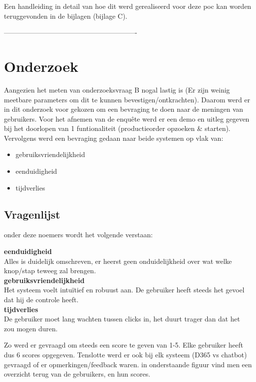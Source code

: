 Een handleiding in detail van hoe dit werd gerealiseerd voor deze poc kan worden teruggevonden in de bijlagen (bijlage C).

----------------------------------------------------------
\section{Onderzoek}
Aangezien het meten van onderzoeksvraag B nogal lastig is (Er zijn weinig meetbare parameters om dit te kunnen bevestigen/ontkrachten). Daarom werd er in dit onderzoek voor gekozen om een bevraging te doen naar de meningen van gebruikers. Voor het afnemen van de enquête werd er een demo en uitleg gegeven bij het doorlopen van 1 funtionaliteit (productieorder opzoeken \& starten). Vervolgens werd een bevraging gedaan naar beide systemen op vlak van: 

\begin{itemize}
    \item gebruiksvriendelijkheid
    \item eenduidigheid
    \item tijdverlies
\end{itemize}

\subsection{Vragenlijst}
onder deze noemers wordt het volgende verstaan:

\textbf{eenduidigheid}\\
Alles is duidelijk omschreven, er heerst geen onduidelijkheid over wat welke knop/stap teweeg zal brengen.\\

\textbf{gebruiksvriendelijkheid}\\
Het systeem voelt intuïtief en robuust aan. De gebruiker heeft steeds het gevoel dat hij de controle heeft.\\

\textbf{tijdverlies}\\
De gebruiker moet lang wachten tussen clicks in, het duurt trager dan dat het zou mogen duren.

Zo werd er gevraagd om steeds een score te geven van 1-5. Elke gebruiker heeft dus 6 scores opgegeven. Tenslotte werd er ook bij elk systeem (D365 vs chatbot) gevraagd of er opmerkingen/feedback waren.
in onderstaande figuur vind men een overzicht terug van de gebruikers, en hun scores.  


